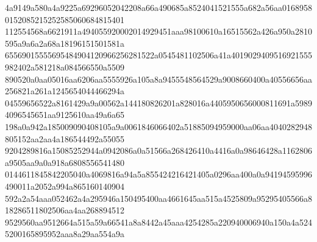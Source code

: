 \documentclass[10pt,letterpaper]{article}
\newenvironment{hexcertificate}{\par\begingroup\ttfamily\scriptsize\raggedright\setlength{\parskip}{0pt}\noindent}{\par\endgroup}
\begin{document}
\begin{hexcertificate}
4a9149a580a4a9225a69296052042208a66a490685a8524041521555a682a56aa01689580152085215252585060684815401\\
112554568a6621911a494055920002014929451aaa98100610a16515562a426a950a2810595a9a6a2a68a18196151501581a\\
65569015555695484904120966256281522a0545481102506a41a4019029409516921555982402a581218a084566550a5509\\
890520a0aa05016aa6206aa5555926a105a8a9455548564529a9008660400a40556656aa256821a261a1245654044466294a\\
04559656522a8161429a9a00562a144180826201a828016a4405950656000811691a59894096545651aa9125610aa49a6a65\\
198a0a942a185009090408105a9a0061846066402a51885094959000aa06aa4040282948805152aa2aa4a186544492a55055\\
9204289816a15085252944a0942086a0a51566a268426410a4416a0a98646428a1162806a9505aa9a0a918a6808556541480\\
0144611845842205040a4069816a94a5a855424216421405a0296aa400a0a94194595996490011a2052a994a865160140904\\
592a2a54aaa052462a4a295946a150495400aa4661645aa515a4525809a95295405566a818286511802506aa4aa268894512\\
9529560aa9512664a515a59a66541a8a8442a45aaa4254285a220940006940a150a4a5245200165895952aaa8a29aa554a9a\\
\end{hexcertificate}
\end{document}

